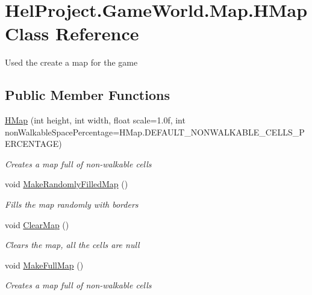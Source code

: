 \hypertarget{class_hel_project_1_1_game_world_1_1_map_1_1_h_map}{}\section{Hel\+Project.\+Game\+World.\+Map.\+H\+Map Class Reference}
\label{class_hel_project_1_1_game_world_1_1_map_1_1_h_map}


Used the create a map for the game  


\subsection*{Public Member Functions}
\begin{DoxyCompactItemize}
\item 
\hyperlink{class_hel_project_1_1_game_world_1_1_map_1_1_h_map_a93cc2548c1f18d85d09ae9c87affd97f}{H\+Map} (int height, int width, float scale=1.\+0f, int non\+Walkable\+Space\+Percentage=\+H\+Map.\+D\+E\+F\+A\+U\+L\+T\+\_\+\+N\+O\+N\+W\+A\+L\+K\+A\+B\+L\+E\+\_\+\+C\+E\+L\+L\+S\+\_\+\+P\+E\+R\+C\+E\+N\+T\+A\+G\+E)
\begin{DoxyCompactList}\small\item\em Creates a map full of non-\/walkable cells \end{DoxyCompactList}\item 
void \hyperlink{class_hel_project_1_1_game_world_1_1_map_1_1_h_map_a50af4bbf5a7d9fd131c70050798230a1}{Make\+Randomly\+Filled\+Map} ()
\begin{DoxyCompactList}\small\item\em Fills the map randomly with borders \end{DoxyCompactList}\item 
void \hyperlink{class_hel_project_1_1_game_world_1_1_map_1_1_h_map_a866544b2e9b7f536371acf03c7b35403}{Clear\+Map} ()
\begin{DoxyCompactList}\small\item\em Clears the map, all the cells are null \end{DoxyCompactList}\item 
void \hyperlink{class_hel_project_1_1_game_world_1_1_map_1_1_h_map_a644aff42a105d8b2b7a9ad0aa4d9ac94}{Make\+Full\+Map} ()
\begin{DoxyCompactList}\small\item\em Creates a map full of non-\/walkable cells \end{DoxyCompactList}\item 

\end{DoxyCompactItemize}
